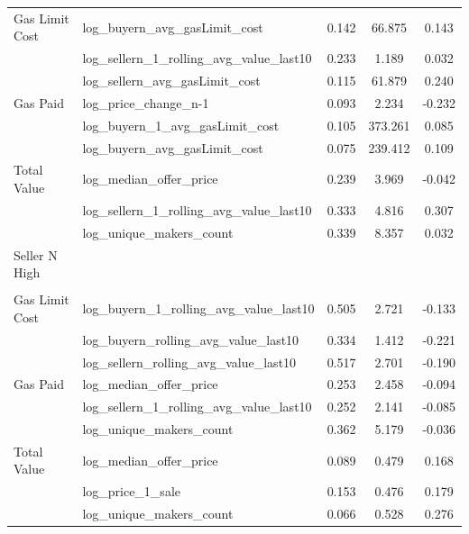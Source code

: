 \begin{table}
\begin{tabular}{llccc}
Gas Limit Cost & log\_buyern\_avg\_gasLimit\_cost & 0.142 & 66.875 & 0.143\\
 & log\_sellern\_1\_rolling\_avg\_value\_last10 & 0.233 & 1.189 & 0.032\\
 & log\_sellern\_avg\_gasLimit\_cost & 0.115 & 61.879 & 0.240\\
Gas Paid & log\_price\_change\_n-1 & 0.093 & 2.234 & -0.232\\
 & log\_buyern\_1\_avg\_gasLimit\_cost & 0.105 & 373.261 & 0.085\\
 & log\_buyern\_avg\_gasLimit\_cost & 0.075 & 239.412 & 0.109\\
Total Value & log\_median\_offer\_price & 0.239 & 3.969 & -0.042\\
 & log\_sellern\_1\_rolling\_avg\_value\_last10 & 0.333 & 4.816 & 0.307\\
 & log\_unique\_makers\_count & 0.339 & 8.357 & 0.032\\
Seller N High &  &  &  & \\
\\
Gas Limit Cost & log\_buyern\_1\_rolling\_avg\_value\_last10 & 0.505 & 2.721 & -0.133\\
 & log\_buyern\_rolling\_avg\_value\_last10 & 0.334 & 1.412 & -0.221\\
 & log\_sellern\_rolling\_avg\_value\_last10 & 0.517 & 2.701 & -0.190\\
Gas Paid & log\_median\_offer\_price & 0.253 & 2.458 & -0.094\\
 & log\_sellern\_1\_rolling\_avg\_value\_last10 & 0.252 & 2.141 & -0.085\\
 & log\_unique\_makers\_count & 0.362 & 5.179 & -0.036\\
Total Value & log\_median\_offer\_price & 0.089 & 0.479 & 0.168\\
 & log\_price\_1\_sale & 0.153 & 0.476 & 0.179\\
 & log\_unique\_makers\_count & 0.066 & 0.528 & 0.276\\
 \bottomrule
\end{tabular}
\end{table}